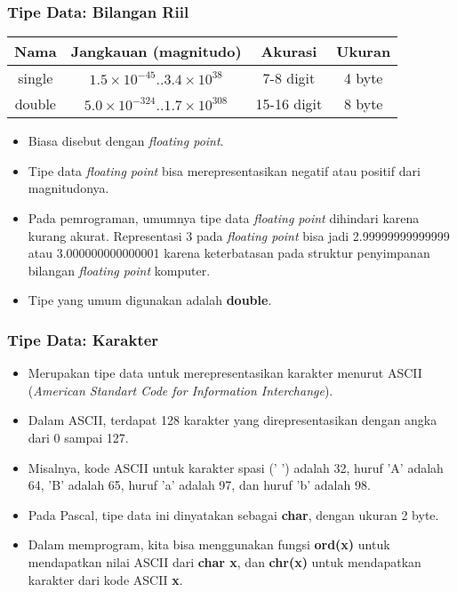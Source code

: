 \documentclass{beamer}
\begin{document}
\begin{frame}
\frametitle{Tipe Data: Bilangan Riil}
\begin{tabular}{|c|c|c|c|}
	\hline Nama  & Jangkauan (magnitudo) & Akurasi & Ukuran \\ 
	\hline single & $1.5\times10^{-45} .. 3.4\times10^{38}$ & 7-8 digit & 4 byte\\ 
	\hline double & $5.0\times10^{-324} .. 1.7\times10^{308}$ & 15-16 digit & 8 byte \\ 
	\hline 
\end{tabular} 
\begin{itemize}
	\item Biasa disebut dengan \alert{\textit{floating point}}.
	\item Tipe data \textit{floating point} bisa merepresentasikan negatif atau positif dari magnitudonya.
	\item Pada pemrograman, umumnya tipe data \textit{floating point} dihindari karena kurang akurat. Representasi 3 pada \textit{floating point} bisa jadi 2.99999999999999 atau 3.000000000000001 karena keterbatasan pada struktur penyimpanan bilangan \textit{floating point} komputer.
	\item Tipe yang umum digunakan adalah \alert{\textbf{double}}.
\end{itemize}
\end{frame}

\begin{frame}
\frametitle{Tipe Data: Karakter}
\begin{itemize}
	\item Merupakan tipe data untuk merepresentasikan karakter menurut ASCII (\textit{American Standart Code for Information Interchange}).
	\item Dalam ASCII, terdapat 128 karakter yang direpresentasikan dengan angka dari 0 sampai 127. 
	\item Misalnya, kode ASCII untuk karakter spasi (' ') adalah 32, huruf 'A' adalah 64, 'B' adalah 65, huruf 'a' adalah 97, dan huruf 'b' adalah 98.
	\item Pada Pascal, tipe data ini dinyatakan sebagai \alert{\textbf{char}}, dengan ukuran 2 byte.
	\item Dalam memprogram, kita bisa menggunakan fungsi \textbf{ord(x)} untuk mendapatkan nilai ASCII dari \textbf{char x}, dan \textbf{chr(x)} untuk mendapatkan karakter dari kode ASCII \textbf{x}.
\end{itemize}
\end{frame}
\end{document}
